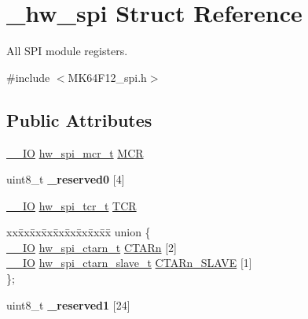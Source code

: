 \hypertarget{struct__hw__spi}{}\section{\+\_\+hw\+\_\+spi Struct Reference}
\label{struct__hw__spi}


All S\+PI module registers.  




{\ttfamily \#include $<$M\+K64\+F12\+\_\+spi.\+h$>$}

\subsection*{Public Attributes}
\begin{DoxyCompactItemize}
\item 
\hyperlink{core__sc300_8h_aec43007d9998a0a0e01faede4133d6be}{\+\_\+\+\_\+\+IO} \hyperlink{union__hw__spi__mcr}{hw\+\_\+spi\+\_\+mcr\+\_\+t} \hyperlink{struct__hw__spi_a101b74d9f01466e25b23696684138049}{M\+CR}
\item 
uint8\+\_\+t {\bfseries \+\_\+reserved0} \mbox{[}4\mbox{]}\hypertarget{struct__hw__spi_a85973e984583e4dd6300474e50d71821}{}\label{struct__hw__spi_a85973e984583e4dd6300474e50d71821}

\item 
\hyperlink{core__sc300_8h_aec43007d9998a0a0e01faede4133d6be}{\+\_\+\+\_\+\+IO} \hyperlink{union__hw__spi__tcr}{hw\+\_\+spi\+\_\+tcr\+\_\+t} \hyperlink{struct__hw__spi_a97ede68093ddab2278b248b657a41bf5}{T\+CR}
\item 
\begin{tabbing}
xx\=xx\=xx\=xx\=xx\=xx\=xx\=xx\=xx\=\kill
union \{\\
\>\hyperlink{core__sc300_8h_aec43007d9998a0a0e01faede4133d6be}{\_\_IO} \hyperlink{union__hw__spi__ctarn}{hw\_spi\_ctarn\_t} \hyperlink{struct__hw__spi_afae54d680e1fb5fc890919c2142e5211}{CTARn} \mbox{[}2\mbox{]}\\
\>\hyperlink{core__sc300_8h_aec43007d9998a0a0e01faede4133d6be}{\_\_IO} \hyperlink{union__hw__spi__ctarn__slave}{hw\_spi\_ctarn\_slave\_t} \hyperlink{struct__hw__spi_a99a927d2c4977158e0bf80f8a7c43e72}{CTARn\_SLAVE} \mbox{[}1\mbox{]}\\
\}; \hypertarget{struct__hw__spi_a11fba49a7cde922e90c7e352b480f701}{}\label{struct__hw__spi_a11fba49a7cde922e90c7e352b480f701}
\\

\end{tabbing}\item 
uint8\+\_\+t {\bfseries \+\_\+reserved1} \mbox{[}24\mbox{]}\hypertarget{struct__hw__spi_a51adc66c738e6d907be26d86d5456f25}{}\label{struct__hw__spi_a51adc66c738e6d907be26d86d5456f25}


\end{DoxyCompactItemize}
